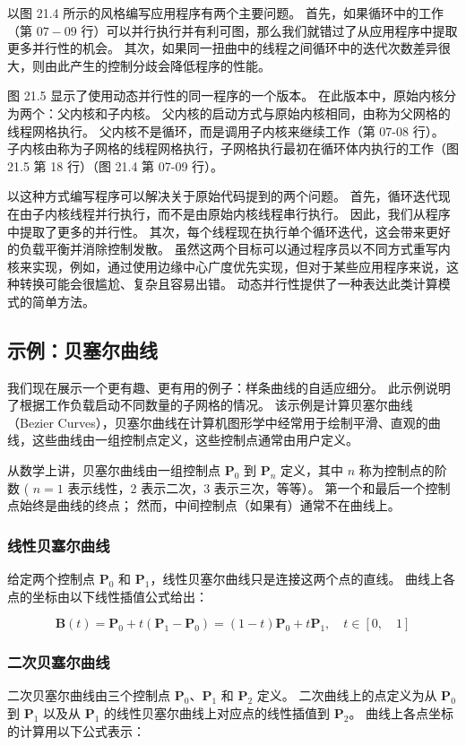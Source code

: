 以图 21.4 所示的风格编写应用程序有两个主要问题。 首先，如果循环中的工作（第 $07-09$ 行）可以并行执行并有利可图，那么我们就错过了从应用程序中提取更多并行性的机会。 其次，如果同一扭曲中的线程之间循环中的迭代次数差异很大，则由此产生的控制分歧会降低程序的性能。

图 21.5 显示了使用动态并行性的同一程序的一个版本。 在此版本中，原始内核分为两个：父内核和子内核。 父内核的启动方式与原始内核相同，由称为父网格的线程网格执行。 父内核不是循环，而是调用子内核来继续工作（第 07-08 行）。 子内核由称为子网格的线程网格执行，子网格执行最初在循环体内执行的工作（图 21.5 第 18 行）（图 21.4 第 07-09 行）。

以这种方式编写程序可以解决关于原始代码提到的两个问题。 首先，循环迭代现在由子内核线程并行执行，而不是由原始内核线程串行执行。 因此，我们从程序中提取了更多的并行性。 其次，每个线程现在执行单个循环迭代，这会带来更好的负载平衡并消除控制发散。 虽然这两个目标可以通过程序员以不同方式重写内核来实现，例如，通过使用边缘中心广度优先实现，但对于某些应用程序来说，这种转换可能会很尴尬、复杂且容易出错。 动态并行性提供了一种表达此类计算模式的简单方法。

\subsection{示例：贝塞尔曲线}
我们现在展示一个更有趣、更有用的例子：样条曲线的自适应细分。 此示例说明了根据工作负载启动不同数量的子网格的情况。 该示例是计算贝塞尔曲线（Bezier Curves），贝塞尔曲线在计算机图形学中经常用于绘制平滑、直观的曲线，这些曲线由一组控制点定义，这些控制点通常由用户定义。

从数学上讲，贝塞尔曲线由一组控制点 $\mathbf{P}_{0}$ 到 $\mathbf{P}_{n}$ 定义，其中 $n$ 称为控制点的阶数 ( $n =1$ 表示线性，2 表示二次，3 表示三次，等等）。 第一个和最后一个控制点始终是曲线的终点； 然而，中间控制点（如果有）通常不在曲线上。

\subsubsection{线性贝塞尔曲线}
给定两个控制点 $\mathbf{P}_{0}$ 和 $\mathbf{P}_{1}$，线性贝塞尔曲线只是连接这两个点的直线。 曲线上各点的坐标由以下线性插值公式给出：

$$
\mathbf{B}(t)=\mathbf{P}_{0}+t\left(\mathbf{P}_{1}-\mathbf{P}_{0}\right)=(1-t ) \mathbf{P}_{0}+t \mathbf{P}_{1}, \quad t \in[0, \quad 1]
$$

\subsubsection{二次贝塞尔曲线}
二次贝塞尔曲线由三个控制点 $\mathbf{P}_{0}、\mathbf{P}_{1}$ 和 $\mathbf{P}_{2}$ 定义。 二次曲线上的点定义为从 $\mathbf{P}_{0}$ 到 $\mathbf{P}_{1}$ 以及从 $\mathbf{P}_{1}$ 的线性贝塞尔曲线上对应点的线性插值到 $\mathbf{P}_{2}$。 曲线上各点坐标的计算用以下公式表示：


